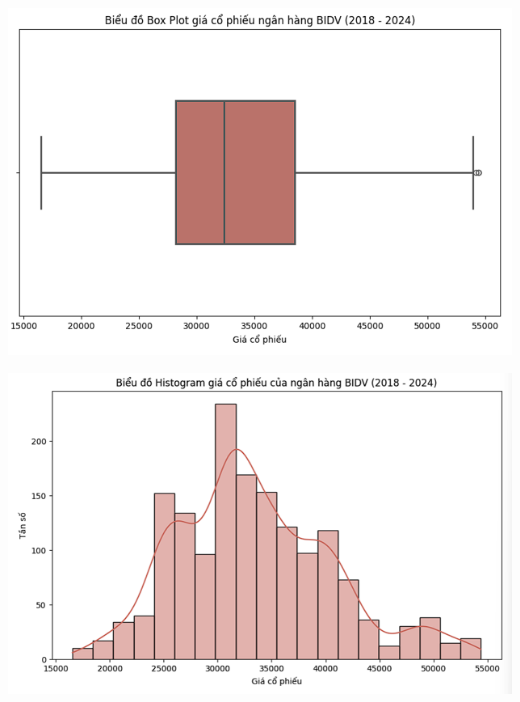 \documentclass[conference]{IEEEtran}
\begin{document}
\begin{minipage}{0.23\textwidth}
    \centering
    \includegraphics[width=\linewidth]{images/Statistic/bidv_boxplot.png}
    \label{fig:image1}
\end{minipage}
\hfill
\begin{minipage}{0.23\textwidth}
    \centering
    \includegraphics[width=\linewidth]{images/Statistic/bidv_histogram.png}
    \label{fig:image2}
\end{minipage}
\end{document}
